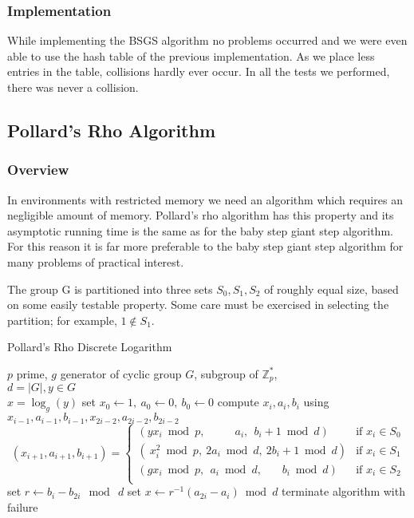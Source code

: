 \documentclass[a4paper, 11pt]{article}
\begin{document}
 \subsubsection{Implementation} 
 While implementing the BSGS algorithm no problems occurred and we were even able to use the hash table of the previous implementation. As we place less entries in the table, collisions hardly ever occur. In all the tests we performed, there was never a collision. 
 
 
 \subsection{Pollard's Rho Algorithm} 
 \subsubsection{Overview} 
 In environments with restricted memory we need an algorithm which requires an negligible amount of memory. 
 Pollard's rho algorithm has this property and its asymptotic running time is the same as for the baby step giant step algorithm. For this reason it is far more preferable to the baby step giant step algorithm for many problems of practical interest. 
 
 The group G is partitioned into three sets $S_0, S_1, S_2$ of roughly  equal size, based on some easily testable property. Some care must be exercised in selecting the partition; for example, $1 \notin S_1$. 
 \begin{algorithm} 
 \caption{ Pollard's Rho Discrete Logarithm} 
 \label{alg4} 
 \begin{algorithmic}[1] 
 \REQUIRE $p$ prime, $g$ generator of cyclic group $G$, subgroup of $\mathbb{Z}^{*}_p$,\\ $d = |G|, y \in G$\\ 
 \ENSURE $x = \log_g(y)$ 
 \STATE set $x_0 \gets 1,~ a_0 \gets 0,~ b_0 \gets 0$ 
 \STATE compute $x_i,a_i,b_i$  using $x_{i-1},a_{i-1},b_{i-1},x_{2i-2},a_{2i-2},b_{2i-2}$ 
 \[(x_{i+1},a_{i+1},b_{i+1}) = \left\{\begin{array}{lr} 
         (y x_i \bmod p,~~~~~~~~~~~~a_i,~~b_i + 1 \bmod d) & \textrm{if } x_i \in S_0\\ 
         (~x_i^2 \bmod p,~2 a_i \bmod d,~2 b_i + 1 \bmod d) & \textrm{if } x_i \in S_1\\ 
         (g x_i \bmod p,~~a_i \bmod d,~~~~~~~~b_i \bmod d) & \textrm{if } x_i \in S_2\\ 
     \end{array} \right. \] 
 \STATE set $r\gets b_i - b_{2i}~ \bmod~ d$ 
 \STATE set $x \gets r^{-1}(a_{2i} - a_i) \bmod d$   
 \ELSE 
 \STATE terminate algorithm with failure 
 \ENDIF 
 \ENDIF 
 \ENDFOR 
 \end{algorithmic} 
 \end{algorithm} 
 
\end{document}
